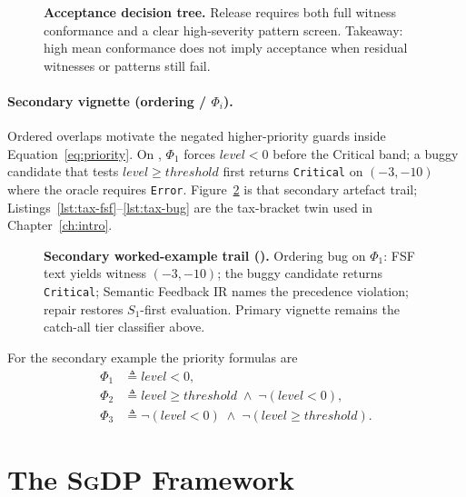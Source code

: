 \begin{figure}[t]
  \centering
  \caption{\textbf{Acceptance decision tree.}
    Release requires both full witness conformance and a clear high-severity
    pattern screen.
    Takeaway: high mean conformance does not imply acceptance when residual
    witnesses or patterns still fail.}
  \label{fig:accept-tree}
\end{figure}

\paragraph{Secondary vignette (ordering / $\Phi_i$).}
Ordered overlaps motivate the negated higher-priority guards inside
Equation~\eqref{eq:priority}.
On , $\Phi_1$ forces $\mathit{level}<0$ before the
Critical band; a buggy candidate that tests $\mathit{level}\ge\mathit{threshold}$
first returns \texttt{Critical} on $(-3,-10)$ where the oracle requires
\texttt{Error}.
Figure~\ref{fig:worked-example-trace} is that secondary artefact trail;
Listings~\ref{lst:tax-fsf}--\ref{lst:tax-bug} are the tax-bracket twin used in
Chapter~\ref{ch:intro}.

\begin{figure}[t]
  \centering
  \caption{\textbf{Secondary worked-example trail ().}
    Ordering bug on $\Phi_1$: FSF text yields witness $(-3,-10)$; the buggy
    candidate returns \texttt{Critical}; Semantic Feedback IR names the
    precedence violation; repair restores $S_1$-first evaluation.
    Primary vignette remains the catch-all tier classifier above.}
  \label{fig:worked-example-trace}
\end{figure}

For the secondary example the priority formulas are
\begin{align}
  \Phi_1 &\triangleq \mathit{level}<0, \label{eq:phi1-example}\\
  \Phi_2 &\triangleq \mathit{level}\ge\mathit{threshold}
           \;\land\; \neg(\mathit{level}<0), \label{eq:phi2-example}\\
  \Phi_3 &\triangleq \neg(\mathit{level}<0)
           \;\land\; \neg(\mathit{level}\ge\mathit{threshold}).
\end{align}

\section{The \textsc{SgDP} Framework}
\label{sec:method:sgdp}

